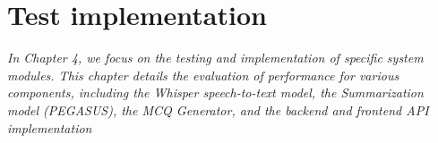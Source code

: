 \chapter{Test implementation}

\textit{In Chapter 4, we focus on the testing and implementation of specific system modules. This chapter details the evaluation of performance for various components, including the Whisper speech-to-text model, the Summarization model (PEGASUS), the MCQ Generator, and the backend and frontend API implementation}







% 

